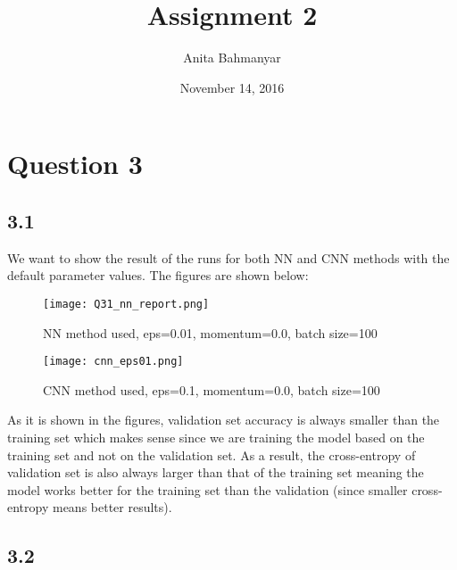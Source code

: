 \documentclass[10pt]{article}
\title{Assignment 2}
\author{Anita Bahmanyar}
\date{November 14, 2016}
\begin{document}
\maketitle


\section*{Question 3}

\subsection*{3.1}
We want to show the result of the runs for both NN and CNN methods with the default parameter values. The figures are shown below:
\begin{figure}[H]
	\centering
	\texttt{[image: Q31\_nn\_report.png]}
	\caption{NN method used, eps=0.01, momentum=0.0, batch size=100}
	\label{fig:}
\end{figure}

\begin{figure}[H]
	\centering
	\texttt{[image: cnn\_eps01.png]}
	\caption{CNN method used, eps=0.1, momentum=0.0, batch size=100}
	\label{fig:}
\end{figure}

As it is shown in the figures, validation set accuracy is always smaller than the training set which makes sense since we are training the model based on the training set and not on the validation set. As a result, the cross-entropy of validation set is also always larger than that of the training set meaning the model works better for the training set than the validation (since smaller cross-entropy means better results).


\subsection*{3.2}
\end{document}
